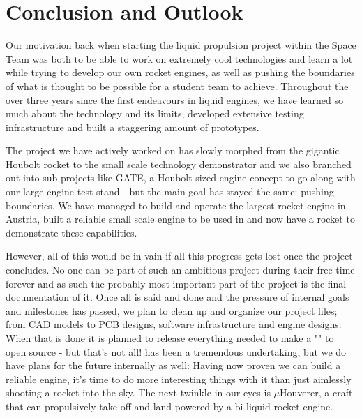 \chapter{Conclusion and Outlook}
\label{sec:conclusion}

Our motivation back when starting the liquid propulsion project within the Space Team was both to be able to work on extremely cool technologies and learn a lot while trying to develop our own rocket engines, as well as pushing the boundaries of what is thought to be possible for a student team to achieve. Throughout the over three years since the first endeavours in liquid engines, we have learned so much about the technology and its limits, developed extensive testing infrastructure and built a staggering amount of prototypes.

The project we have actively worked on has slowly morphed from the gigantic Houbolt rocket to the small scale technology demonstrator \uH and we also branched out into sub-projects like GATE, a Houbolt-sized engine concept to go along with our large engine test stand - but the main goal has stayed the same: pushing boundaries. We have managed to build and operate the largest rocket engine in Austria, built a reliable small scale engine to be used in \uH and now have a rocket to demonstrate these capabilities.

However, all of this would be in vain if all this progress gets lost once the project concludes. No one can be part of such an ambitious project during their free time forever and as such the probably most important part of the project is the final documentation of it. Once all is said and done and the pressure of internal goals and milestones has passed, we plan to clean up and organize our project files; from CAD models to PCB designs, software infrastructure and engine designs. When that is done it is planned to release everything needed to make a "" to open source - but that's not all! \uH has been a tremendous undertaking, but we do have plans for the future internally as well: Having now proven we can build a reliable engine, it's time to do more interesting things with it than just aimlessly shooting a rocket into the sky. The next twinkle in our eyes is $\mu$Houverer, a craft that can propulsively take off and land powered by a bi-liquid rocket engine.